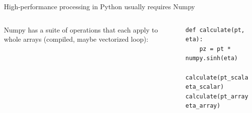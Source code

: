 \documentclass[aspectratio=169]{beamer}
\begin{document}
\begin{frame}[fragile]{High-performance processing in Python usually requires Numpy}
\Large
\vspace{0.5 cm}
\begin{columns}
Numpy has a suite of operations that each apply to whole arrays (compiled, maybe vectorized loop):

\small
\begin{verbatim}
def calculate(pt, eta):
    pz = pt * numpy.sinh(eta)

calculate(pt_scalar, eta_scalar)
calculate(pt_array,  eta_array)
\end{verbatim}

\Large
\vspace{0.5 cm}


\end{columns}
\end{frame}
\end{document}
